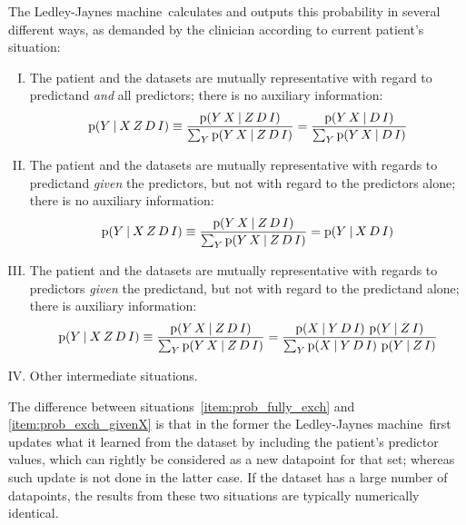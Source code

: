 \documentclass[utf8]{FrontiersinHarvard} %
\newcommand*{\p}{\mathrm{p}}%
\renewcommand*{\|}[1][]{\nonscript\:#1\vert\nonscript\:\mathopen{}}
\newcommand*{\ljm}{Ledley-Jaynes machine}
\begin{document}
The \ljm\ calculates and outputs this probability in several different ways, as demanded by the clinician according to current patient's situation:
\begin{enumerate}[I.]
\item\label{item:prob_fully_exch} The patient and the datasets are mutually representative with regard to predictand \emph{and} all predictors; there is no auxiliary information:
  \begin{equation}
  \label{eq:prob_fully_exch}
  \p(Y \| X\,Z\,D\,I) \equiv
  \frac{\p(Y\, X \| Z\, D\, I)}{\sum_{Y}\p(Y\, X \| Z\, D\, I)} =
  \frac{\p(Y\, X \| D\, I)}{\sum_{Y}\p(Y\, X \| D\, I)}
\end{equation}

\item\label{item:prob_exch_givenX} The patient and the datasets are mutually representative with regards to predictand \emph{given} the predictors, but not with regard to the predictors alone; there is no auxiliary information:
  \begin{equation}
  \label{eq:prob_exch_givenX}
  \p(Y \| X\,Z\,D\,I) \equiv
  \frac{\p(Y\, X \| Z\, D\, I)}{\sum_{Y}\p(Y\, X \| Z\, D\, I)} =
  \p(Y \| X\, D\, I)
\end{equation}

\item\label{item:prob_exch_givenY} The patient and the datasets are mutually representative with regards to predictors \emph{given} the predictand, but not with regard to the predictand alone; there is auxiliary information:
  \begin{equation}
  \label{eq:prob_exch_givenY}
  \p(Y \| X\,Z\,D\,I) \equiv
  \frac{\p(Y\, X \| Z\, D\, I)}{\sum_{Y}\p(Y\, X \| Z\, D\, I)} =
  \frac{\p(X\| Y \, D\, I)\ \p(Y\| Z\,I)}{\sum_{Y}\p(X\| Y \, D\, I)\
  \p(Y \| Z\, I)}
\end{equation}

\item\label{item:prob_exch_other} Other intermediate situations.

\end{enumerate}
The difference between situations~\ref{item:prob_fully_exch} and \ref{item:prob_exch_givenX} is that in the former the \ljm\ first updates what it learned from the dataset by including the patient's predictor values, which can rightly be considered as a new datapoint for that set; whereas such update is not done in the latter case. If the dataset has a large number of datapoints, the results from these two situations are typically numerically identical.
\end{document}
